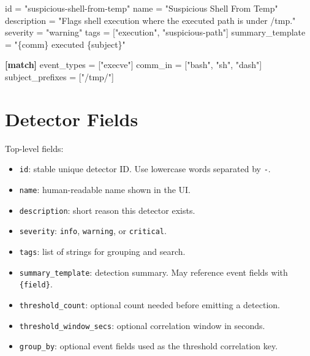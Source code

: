 \documentclass[
  12pt,
]{report}
\newenvironment{Shaded}{}{}
\newcommand{\DataTypeTok}[1]{\textcolor[rgb]{0.56,0.13,0.00}{#1}}
\newcommand{\KeywordTok}[1]{\textcolor[rgb]{0.00,0.44,0.13}{\textbf{#1}}}
\newcommand{\OperatorTok}[1]{\textcolor[rgb]{0.40,0.40,0.40}{#1}}
\newcommand{\StringTok}[1]{\textcolor[rgb]{0.25,0.44,0.63}{#1}}
\providecommand{\tightlist}{%
  \setlength{\itemsep}{0pt}\setlength{\parskip}{0pt}}
\begin{document}
\begin{Shaded}
\begin{Highlighting}[]
\DataTypeTok{id} \OperatorTok{=} \StringTok{"suspicious{-}shell{-}from{-}temp"}
\DataTypeTok{name} \OperatorTok{=} \StringTok{"Suspicious Shell From Temp"}
\DataTypeTok{description} \OperatorTok{=} \StringTok{"Flags shell execution where the executed path is under /tmp."}
\DataTypeTok{severity} \OperatorTok{=} \StringTok{"warning"}
\DataTypeTok{tags} \OperatorTok{=} \OperatorTok{[}\StringTok{"execution"}\OperatorTok{,} \StringTok{"suspicious{-}path"}\OperatorTok{]}
\DataTypeTok{summary\_template} \OperatorTok{=} \StringTok{"\{comm\} executed \{subject\}"}

\KeywordTok{[match]}
\DataTypeTok{event\_types} \OperatorTok{=} \OperatorTok{[}\StringTok{"execve"}\OperatorTok{]}
\DataTypeTok{comm\_in} \OperatorTok{=} \OperatorTok{[}\StringTok{"bash"}\OperatorTok{,} \StringTok{"sh"}\OperatorTok{,} \StringTok{"dash"}\OperatorTok{]}
\DataTypeTok{subject\_prefixes} \OperatorTok{=} \OperatorTok{[}\StringTok{"/tmp/"}\OperatorTok{]}
\end{Highlighting}
\end{Shaded}

\section{Detector Fields}\label{detector-fields}

Top-level fields:

\begin{itemize}
\tightlist
\item
  \texttt{id}: stable unique detector ID. Use lowercase words separated
  by \texttt{-}.
\item
  \texttt{name}: human-readable name shown in the UI.
\item
  \texttt{description}: short reason this detector exists.
\item
  \texttt{severity}: \texttt{info}, \texttt{warning}, or
  \texttt{critical}.
\item
  \texttt{tags}: list of strings for grouping and search.
\item
  \texttt{summary\_template}: detection summary. May reference event
  fields with \texttt{\{field\}}.
\item
  \texttt{threshold\_count}: optional count needed before emitting a
  detection.
\item
  \texttt{threshold\_window\_secs}: optional correlation window in
  seconds.
\item
  \texttt{group\_by}: optional event fields used as the threshold
  correlation key.
\end{itemize}
\end{document}

